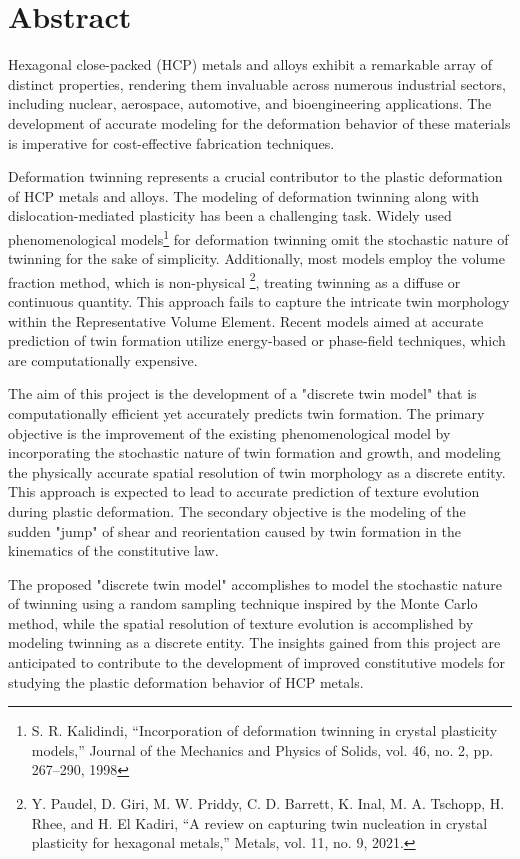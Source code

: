 \chapter*{\centering Abstract}
  {\fontsize{14}{16}\selectfont Hexagonal close-packed (HCP) metals and alloys exhibit a remarkable array of distinct properties, rendering them invaluable across numerous industrial sectors, including nuclear, aerospace, automotive, and bioengineering applications. The development of accurate modeling for the deformation behavior of these materials is imperative for cost-effective fabrication techniques.

Deformation twinning represents a crucial contributor to the plastic deformation of HCP metals and alloys. The modeling of deformation twinning along with dislocation-mediated plasticity has been a challenging task. Widely used phenomenological models\footnote{S. R. Kalidindi, “Incorporation of deformation twinning in crystal plasticity models,” Journal of the Mechanics and Physics of Solids, vol. 46, no. 2, pp. 267–290, 1998} for deformation twinning omit the stochastic nature of twinning for the sake of simplicity. Additionally, most models employ the volume fraction method, which is non-physical \footnote{Y. Paudel, D. Giri, M. W. Priddy, C. D. Barrett, K. Inal, M. A. Tschopp, H. Rhee, and H. El Kadiri, “A review on capturing twin nucleation in crystal plasticity for hexagonal metals,” Metals, vol. 11, no. 9, 2021. }, treating twinning as a diffuse or continuous quantity. This approach fails to capture the intricate twin morphology within the Representative Volume Element. Recent models aimed at accurate prediction of twin formation utilize energy-based or phase-field techniques, which are computationally expensive.

The aim of this project is the development of a "discrete twin model" that is computationally efficient yet accurately predicts twin formation. The primary objective is the improvement of the existing phenomenological model by incorporating the stochastic nature of twin formation and growth, and modeling the physically accurate spatial resolution of twin morphology as a discrete entity. This approach is expected to lead to accurate prediction of texture evolution during plastic deformation. The secondary objective is the modeling of the sudden "jump" of shear and reorientation caused by twin formation in the kinematics of the constitutive law.

The proposed "discrete twin model" accomplishes to model the stochastic nature of twinning using a random sampling technique inspired by the Monte Carlo method, while the spatial resolution of texture evolution is accomplished by modeling twinning as a discrete entity. The insights gained from this project are anticipated to contribute to the development of improved constitutive models for studying the plastic deformation behavior of HCP metals.}